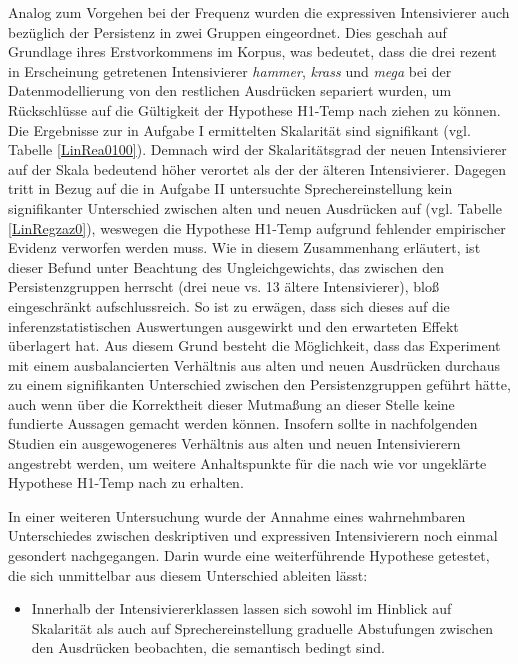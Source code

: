 Analog zum Vorgehen bei der Frequenz wurden die expressiven Intensivierer auch bezüglich der Persistenz in zwei Gruppen eingeordnet. Dies geschah auf Grundlage ihres Erstvorkommens im Korpus, was bedeutet, dass die drei rezent in Erscheinung getretenen Intensivierer \textit{hammer}, \textit{krass} und \textit{mega} bei der Datenmodellierung von den restlichen Ausdrücken separiert wurden, um Rückschlüsse auf die Gültigkeit der Hypothese H1-Temp nach \citet[59]{Tobler.1868} ziehen zu können. Die Ergebnisse zur in Aufgabe I ermittelten Skalarität sind signifikant (vgl. Tabelle \ref{LinRea0100}). Demnach wird der Skalaritätsgrad der neuen Intensivierer auf der Skala bedeutend höher verortet als der der älteren Intensivierer. Dagegen tritt in Bezug auf die in Aufgabe II untersuchte Sprechereinstellung kein signifikanter Unterschied zwischen alten und neuen Ausdrücken auf (vgl. Tabelle \ref{LinRegzaz0}), weswegen die Hypothese {H1-Temp} aufgrund fehlender empirischer Evidenz verworfen werden muss. Wie in diesem Zusammenhang erläutert, ist dieser Befund unter Beachtung des Ungleichgewichts, das zwischen den Persistenzgruppen herrscht (drei neue vs. 13 ältere Intensivierer), bloß eingeschränkt aufschlussreich. So ist zu erwägen, dass sich dieses auf die inferenzstatistischen Auswertungen ausgewirkt und den erwarteten Effekt überlagert hat. Aus diesem Grund besteht die Möglichkeit, dass das Experiment mit einem ausbalancierten Verhältnis aus alten und neuen Ausdrücken durchaus zu einem signifikanten Unterschied zwischen den Persistenzgruppen geführt hätte, auch wenn über die Korrektheit dieser Mutmaßung an dieser Stelle keine fundierte Aussagen gemacht werden können. Insofern sollte in nachfolgenden Studien ein ausgewogeneres Verhältnis aus alten und neuen Intensivierern angestrebt werden, um weitere Anhaltspunkte für die nach wie vor ungeklärte Hypothese H1-Temp nach \citet[59]{Tobler.1868} zu erhalten.

In einer weiteren Untersuchung wurde der Annahme eines wahrnehmbaren Unterschiedes zwischen deskriptiven und expressiven Intensivierern noch einmal gesondert nachgegangen. Darin wurde eine weiterführende Hypothese getestet, die sich unmittelbar aus diesem Unterschied ableiten lässt: 

\begin{itemize}
\item[\textbf{\textsc{H6}}] Innerhalb der Intensiviererklassen lassen sich sowohl im Hinblick auf Skalarität als auch auf Sprechereinstellung graduelle Abstufungen zwischen den Ausdrücken beobachten, die semantisch bedingt sind. 
\end{itemize}

